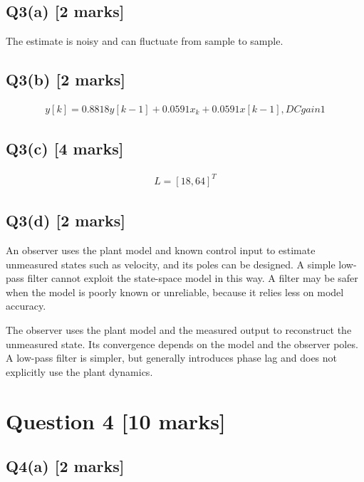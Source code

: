 \documentclass[11pt,a4paper]{article}
\begin{document}
\subsection*{Q3(a) \hfill [2 marks]}

The estimate is noisy and can fluctuate from sample to sample.

\subsection*{Q3(b) \hfill [2 marks]}

\[\begin{aligned}y[k]=0.8818y[k-1]+0.0591x_k+0.0591x[k-1], DC gain 1\end{aligned}\]

\subsection*{Q3(c) \hfill [4 marks]}

\[\begin{aligned}L = [18,64]^T\end{aligned}\]

\subsection*{Q3(d) \hfill [2 marks]}

An observer uses the plant model and known control input to estimate unmeasured states such as velocity, and its poles can be designed.
A simple low-pass filter cannot exploit the state-space model in this way.
A filter may be safer when the model is poorly known or unreliable, because it relies less on model accuracy.\par\smallskip The observer uses the plant model and the measured output to reconstruct the unmeasured state. Its convergence depends on the model and the observer poles. A low-pass filter is simpler, but generally introduces phase lag and does not explicitly use the plant dynamics.

\section*{Question 4 \hfill [10 marks]}
\subsection*{Q4(a) \hfill [2 marks]}

\vspace{2mm}
\end{document}
